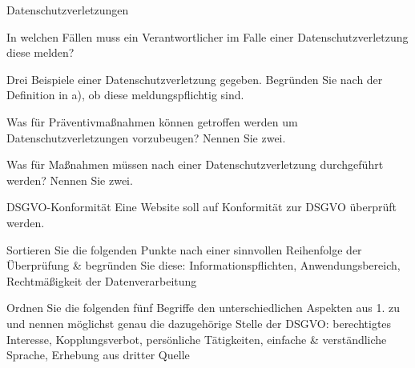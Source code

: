 \documentclass{exercisesheet}
\begin{document}
\begin{exercises}{Datenschutzverletzungen}
\item In welchen Fällen muss ein Verantwortlicher im Falle einer Datenschutzverletzung diese melden?
\item Drei Beispiele einer Datenschutzverletzung gegeben. Begründen Sie nach der Definition in a), ob diese meldungspflichtig sind.
\item Was für Präventivmaßnahmen können getroffen werden um Datenschutzverletzungen vorzubeugen? Nennen Sie zwei.
\item Was für Maßnahmen müssen nach einer Datenschutzverletzung durchgeführt werden? Nennen Sie zwei.
\end{exercises}

\begin{eexercises}{DSGVO-Konformität}{
    Eine Website soll auf Konformität zur DSGVO überprüft werden.
  }
  \item Sortieren Sie die folgenden Punkte nach einer sinnvollen Reihenfolge der Überprüfung \& begründen Sie diese: Informationspflichten, Anwendungsbereich, Rechtmäßigkeit der Datenverarbeitung
  \item Ordnen Sie die folgenden fünf Begriffe den unterschiedlichen Aspekten aus 1. zu und nennen möglichst genau die dazugehörige Stelle der DSGVO: berechtigtes Interesse, Kopplungsverbot, persönliche Tätigkeiten, einfache \& verständliche Sprache, Erhebung aus dritter Quelle
\end{eexercises}
\end{document}
